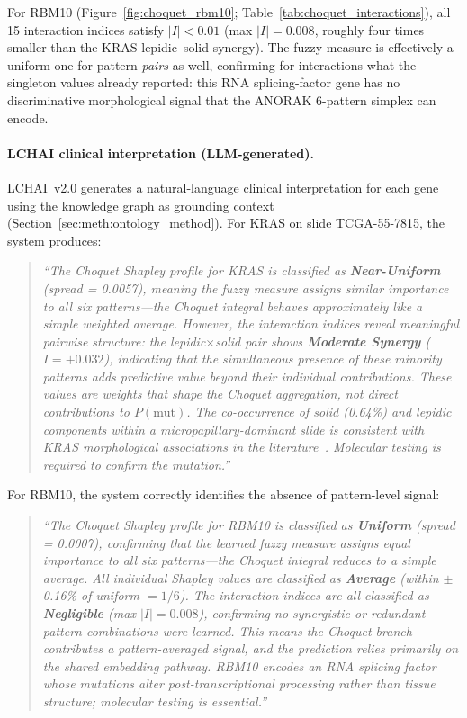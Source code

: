 For RBM10 (Figure~\ref{fig:choquet_rbm10};
Table~\ref{tab:choquet_interactions}), all 15 interaction indices
satisfy $|I| < 0.01$ (max $|I| = 0.008$, roughly four times smaller
than the KRAS lepidic--solid synergy).
The fuzzy measure is effectively a uniform one for pattern
\emph{pairs} as well, confirming for interactions what the
singleton values already reported: this RNA splicing-factor gene
has no discriminative morphological signal that the ANORAK
6-pattern simplex can encode.

\paragraph{LCHAI clinical interpretation (LLM-generated).}
LCHAI~v2.0 generates a natural-language clinical interpretation for
each gene using the knowledge graph as grounding context
(Section~\ref{sec:meth:ontology_method}).
For KRAS on slide TCGA-55-7815, the system produces:

\begin{quote}
\emph{``The Choquet Shapley profile for KRAS is classified as
\textbf{Near-Uniform} (spread = 0.0057), meaning the fuzzy measure
assigns similar importance to all six patterns---the Choquet integral
behaves approximately like a simple weighted average.
However, the interaction indices reveal meaningful pairwise structure:
the lepidic$\times$solid pair shows \textbf{Moderate Synergy}
($I = +0.032$), indicating that the simultaneous presence of these
minority patterns adds predictive value beyond their individual
contributions.
These values are weights that shape the Choquet aggregation, not
direct contributions to $P(\text{mut})$.
The co-occurrence of solid (0.64\%) and lepidic components within a
micropapillary-dominant slide is consistent with KRAS morphological
associations in the literature~\cite{shim2015krasmucinous}.
Molecular testing is required to confirm the mutation.''}
\end{quote}

For RBM10, the system correctly identifies the absence of
pattern-level signal:

\begin{quote}
\emph{``The Choquet Shapley profile for RBM10 is classified as
\textbf{Uniform} (spread = 0.0007), confirming that the learned
fuzzy measure assigns equal importance to all six patterns---the
Choquet integral reduces to a simple average.
All individual Shapley values are classified as \textbf{Average}
(within $\pm$0.16\% of uniform $= 1/6$).
The interaction indices are all classified as \textbf{Negligible}
(max $|I| = 0.008$), confirming no synergistic or redundant pattern
combinations were learned.
This means the Choquet branch contributes a pattern-averaged signal,
and the prediction relies primarily on the shared embedding pathway.
RBM10 encodes an RNA splicing factor whose mutations alter
post-transcriptional processing rather than tissue structure;
molecular testing is essential.''}
\end{quote}

